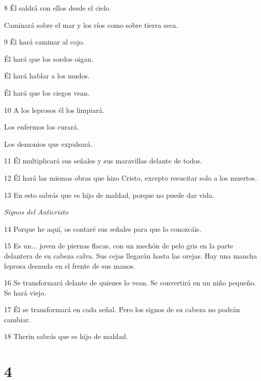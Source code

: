 \par 8 Él saldrá con ellos desde el cielo.

\par Caminará sobre el mar y los ríos como sobre tierra seca.

\par 9 Él hará caminar al cojo.

\par Él hará que los sordos oigan.

\par Él hará hablar a los mudos.

\par Él hará que los ciegos vean.

\par 10 A los leprosos él los limpiará.

\par Los enfermos los curará.

\par Los demonios que expulsará.

\par 11 Él multiplicará sus señales y sus maravillas delante de todos.

\par 12 Él hará las mismas obras que hizo Cristo, excepto resucitar solo a los muertos.

\par 13 En esto sabrás que es hijo de maldad, porque no puede dar vida.

\par \textit{Signos del Anticristo}

\par 14 Porque he aquí, os contaré sus señales para que lo conozcáis.

\par 15 Es un... joven de piernas flacas, con un mechón de pelo gris en la parte delantera de su cabeza calva. Sus cejas llegarán hasta las orejas. Hay una mancha leprosa desnuda en el frente de sus manos.

\par 16 Se transformará delante de quienes lo vean. Se convertirá en un niño pequeño. Se hará viejo.

\par 17 Él se transformará en cada señal. Pero los signos de su cabeza no podrán cambiar.

\par 18 Therin sabrás que es hijo de maldad.

\chapter{4}

